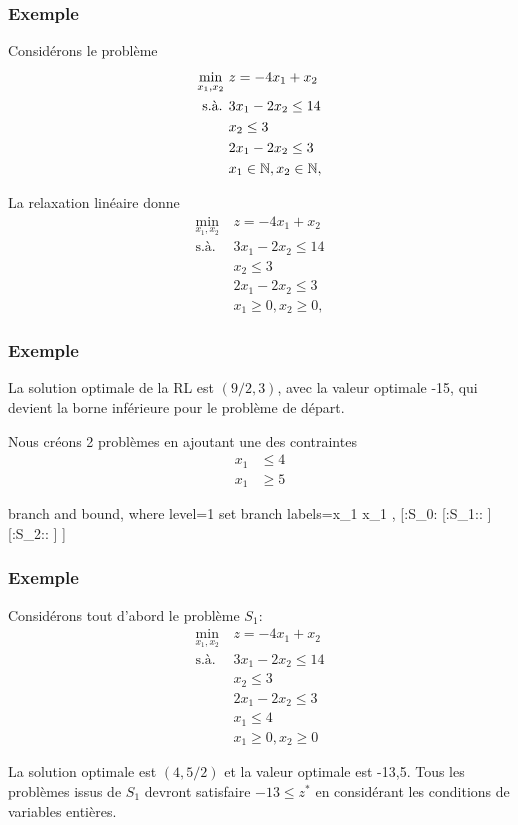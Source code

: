 \documentclass[usepdftitle=false, aspectratio=169]{beamer}
\newcommand{\extraprotect}[1]{\unexpanded{\unexpanded{#1}}}
\begin{document}
\begin{frame}
\frametitle{Exemple}

Considérons le problème
\begin{align*}
		\min_{x_1,x_2} \ & z = -4x_1+x_2 \\
		\mbox{s.à. } & 3x_1 - 2x_2 \leq 14 \\ 
		& x_2 \leq 3 \\
		& 2x_1 - 2x_2 \leq 3 \\
		& x_1 \in {\mathbb{N}}, x_2 \in {\mathbb{N}},
\end{align*}

La relaxation linéaire donne
\begin{align*}
	\min_{x_1,x_2} \ & z = -4x_1+x_2 \\
	\mbox{s.à. } & 3x_1 - 2x_2 \leq 14 \\ 
	& x_2 \leq 3 \\
	& 2x_1 - 2x_2 \leq 3 \\
	& x_1 \geq 0, x_2 \geq 0,
\end{align*}

\end{frame}

\begin{frame}
\frametitle{Exemple}

La solution optimale de la RL est $(9/2, 3)$, avec la valeur optimale -15, qui devient la borne inférieure pour le problème de départ.

Nous créons 2 problèmes en ajoutant une des contraintes
\begin{align*}
x_1 &\leq 4 \\
x_1 &\geq 5
\end{align*}

	\begin{center}
	\begin{forest}
		branch and bound,
		where level=1{
			set branch labels={x_1 }{}{x_1 }{},
		}{
		}
		[\extraprotect{\big($\frac{9}{2}$,3\big)}:S_0:\extraprotect{$-15 \leq z^* \leq +\infty$}
		[:S_1::
		]
		[:S_2::
		]
		]
	\end{forest}
\end{center}

\end{frame}

\begin{frame}
\frametitle{Exemple}

Considérons tout d'abord le problème $S_1$:
	\begin{align*}
		\min_{x_1,x_2} \ & z = -4x_1+x_2 \\
		\mbox{s.à. } & 3x_1 - 2x_2 \leq 14 \\ 
		& x_2 \leq 3 \\
		& 2x_1 - 2x_2 \leq 3 \\
		& x_1 \leq 4 \\
		& x_1 \geq 0, x_2 \geq 0
	\end{align*}

La solution optimale est $(4, 5/2)$ et la valeur optimale est -13,5. Tous les problèmes issus de $S_1$ devront satisfaire $-13 \leq z^*$ en considérant les conditions de variables entières.
	
\end{frame}
\end{document}
